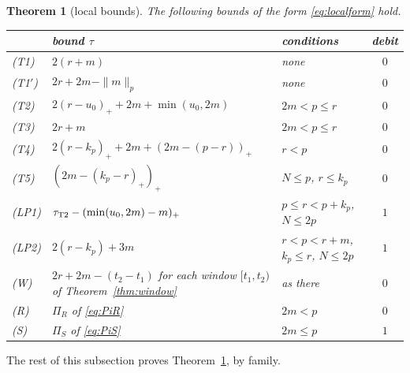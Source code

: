 \documentclass[11pt]{amsart}
\newtheorem{theorem}{Theorem}[section]
\theoremstyle{definition}
\theoremstyle{remark}
\numberwithin{equation}{section}
\begin{document}
\begin{theorem}[local bounds]\label{thm:local}
The following bounds of the form \eqref{eq:localform} hold.
\begin{center}
{\renewcommand{\arraystretch}{1.2}
\begin{tabular}{@{}lp{}p{}c@{}}
\toprule
 & bound $\tau$ & conditions & debit\\
\midrule
(T1) & $2(r+m)$ & none & $0$\\
(T1$'$) & $2r+2m-\|m\|_p$ & none & $0$\\
(T2) & $2(r-u_0)_++2m+\min(u_0,2m)$ & $2m<p\le r$ & $0$\\
(T3) & $2r+m$ & $2m<p\le r$ & $0$\\
(T4) & $2(r-k_p)_++2m+(2m-(p-r))_+$ & $r<p$ & $0$\\
(T5) & $(2m-(k_p-r)_+)_+$ & $N\le p$, $r\le k_p$ & $0$\\
(LP1) & $\tau_{\rm T2}-(\min(u_0,2m)-m)_+$ & $p\le r<p+k_p$, $N\le2p$ & $1$\\
(LP2) & $2(r-k_p)+3m$ & $r<p<r+m$, $k_p\le r$, $N\le2p$ & $1$\\
(W) & $2r+2m-(t_2-t_1)$ for each window $[t_1,t_2)$ of Theorem~\ref{thm:window} & as there & $0$\\
(R) & $\Pi_R$ of \eqref{eq:PiR} & $2m<p$ & $0$\\
(S) & $\Pi_S$ of \eqref{eq:PiS} & $2m\le p$ & $1$\\
\bottomrule
\end{tabular}}
\end{center}
\end{theorem}

The rest of this subsection proves Theorem~\ref{thm:local}, by family.
\end{document}
